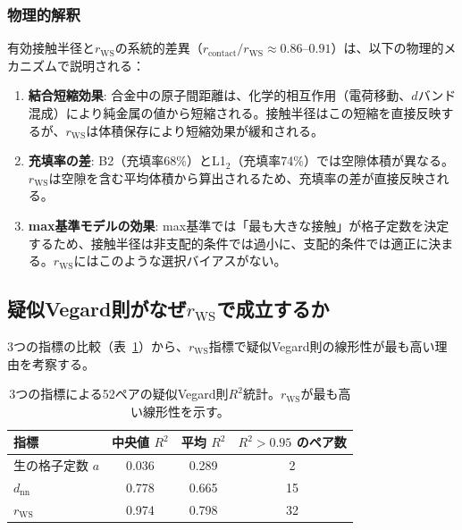 \documentclass[a4paper,10pt,5p]{elsarticle}
\begin{document}
\subsubsection{物理的解釈}
有効接触半径と$r_\mathrm{WS}$の系統的差異（$r_\mathrm{contact}/r_\mathrm{WS} \approx 0.86$--$0.91$）は、以下の物理的メカニズムで説明される：

\begin{enumerate}
\setlength{\parskip}{0cm}
\setlength{\itemsep}{0cm}
    \item \textbf{結合短縮効果}: 合金中の原子間距離は、化学的相互作用（電荷移動、$d$バンド混成）により純金属の値から短縮される。接触半径はこの短縮を直接反映するが、$r_\mathrm{WS}$は体積保存により短縮効果が緩和される。
    \item \textbf{充填率の差}: B2（充填率68\%）とL1$_2$（充填率74\%）では空隙体積が異なる。$r_\mathrm{WS}$は空隙を含む平均体積から算出されるため、充填率の差が直接反映される。
    \item \textbf{max基準モデルの効果}: max基準では「最も大きな接触」が格子定数を決定するため、接触半径は非支配的条件では過小に、支配的条件では適正に決まる。$r_\mathrm{WS}$にはこのような選択バイアスがない。
\end{enumerate}


\subsection{疑似Vegard則がなぜ$r_\mathrm{WS}$で成立するか}
3つの指標の比較（表~\ref{tab:three_metrics}）から、$r_\mathrm{WS}$指標で疑似Vegard則の線形性が最も高い理由を考察する。

\begin{table}[htbp]
\small
    \centering
    \caption{3つの指標による52ペアの疑似Vegard則$R^2$統計。$r_\mathrm{WS}$が最も高い線形性を示す。}
    \label{tab:three_metrics}
    \begin{tabular}{lccc}
        \toprule
        指標 & 中央値 $R^2$ & 平均 $R^2$ & $R^2 > 0.95$ のペア数 \\
        \midrule
        生の格子定数 $a$ & 0.036 & 0.289 & 2 \\
        $d_\mathrm{nn}$ & 0.778 & 0.665 & 15 \\
        $r_\mathrm{WS}$ & 0.974 & 0.798 & 32 \\
        \bottomrule
    \end{tabular}
\end{table}
\end{document}
